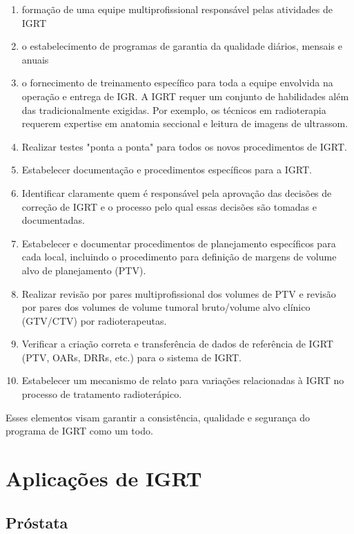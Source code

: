 \documentclass[11pt,a4paper]{article}
\newcounter{exemplo}
\begin{document}
	\begin{enumerate}
		\item  formação de uma equipe multiprofissional responsável pelas atividades de IGRT
		\item o estabelecimento de programas de garantia da qualidade diários, mensais e anuais
		\item o fornecimento de treinamento específico para toda a equipe envolvida na operação e entrega de IGR. A IGRT requer um conjunto de habilidades além das tradicionalmente exigidas. Por exemplo, os técnicos em radioterapia requerem expertise em anatomia seccional e leitura de imagens de ultrassom.
		\item Realizar testes "ponta a ponta" para todos os novos procedimentos de IGRT.
		\item Estabelecer documentação e procedimentos específicos para a IGRT.
		\item Identificar claramente quem é responsável pela aprovação das decisões de correção de IGRT e o processo pelo qual essas decisões são tomadas e documentadas.
		\item Estabelecer e documentar procedimentos de planejamento específicos para cada local, incluindo o procedimento para definição de margens de volume alvo de planejamento (PTV).
		\item Realizar revisão por pares multiprofissional dos volumes de PTV e revisão por pares dos volumes de volume tumoral bruto/volume alvo clínico (GTV/CTV) por radioterapeutas.
		\item Verificar a criação correta e transferência de dados de referência de IGRT (PTV, OARs, DRRs, etc.) para o sistema de IGRT.
		\item Estabelecer um mecanismo de relato para variações relacionadas à IGRT no processo de tratamento radioterápico.
	\end{enumerate}
	
	Esses elementos visam garantir a consistência, qualidade e segurança do programa de IGRT como um todo.

\section{Aplicações de IGRT}

\subsection*{Próstata}
\end{document}
